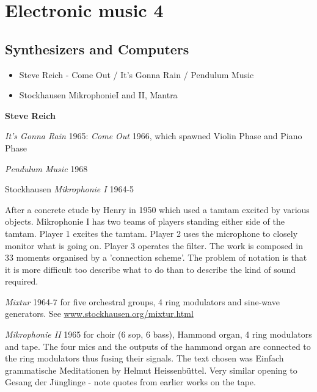 
\chapter{Electronic music 4}
\label{history4}

\section{Synthesizers and Computers}
\begin{itemize}
\item Steve Reich - Come Out / It's Gonna Rain / Pendulum Music
\item Stockhausen MikrophonieI and II, Mantra
\end{itemize}

\textbf{Steve Reich}

\textit{It's Gonna Rain} 1965: \textit{Come Out} 1966,  which spawned Violin Phase and Piano Phase

\textit{Pendulum Music} 1968

Stockhausen \textit{Mikrophonie I} 1964-5

After a concrete etude by Henry in 1950 which used a tamtam excited by various objects. Mikrophonie I has two teams of players standing either side of the tamtam. Player 1 excites the tamtam. Player 2 uses the microphone to closely monitor what is going on. Player 3 operates the filter. The work is composed in 33 moments organised by a 'connection scheme'. The problem of notation is that it is more difficult too describe what to do than to describe the kind of sound required.

\textit{Mixtur} 1964-7 for five orchestral groups, 4 ring modulators and sine-wave generators. See \url{www.stockhausen.org/mixtur.html}

\textit{Mikrophonie II} 1965 for choir (6 sop, 6 bass), Hammond organ, 4 ring modulators and tape. The four mics and the outputs of the hammond organ are connected to the ring modulators thus fusing their signals. The text chosen was Einfach grammatische Meditationen by Helmut Heissenbüttel. Very similar opening to Gesang der Jünglinge - note quotes from earlier works on the tape.

